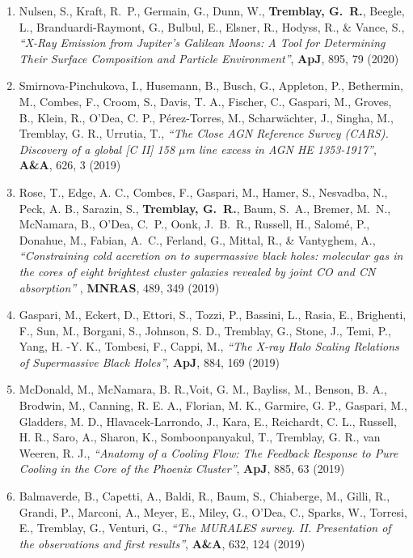 \documentclass[11pt]{article}
\begin{document}
\begin{enumerate}[resume]
\item Nulsen, S., Kraft, R.~P., Germain, G., Dunn, W.,
\textbf{Tremblay, G.~R.}, Beegle, L., Branduardi-Raymont, G.,
Bulbul, E., Elsner, R., Hodyss, R., \& Vance, S., \textit{``X-Ray Emission from Jupiter's Galilean Moons: A Tool for Determining Their Surface Composition and Particle Environment''}, \textbf{ApJ}, 895, 79 (2020)

\item Smirnova-Pinchukova, I., Husemann, B.,  Busch, G.,  Appleton, P., Bethermin, M., Combes, F., Croom, S., Davis, T. A., Fischer, C., Gaspari, M., Groves, B., Klein, R., O'Dea, C. P., Pérez-Torres, M., Scharwächter, J., Singha, M., Tremblay, G. R., Urrutia, T.,
\textit{``The Close AGN Reference Survey (CARS). Discovery of a global [C II] 158 $\mu$m line excess in AGN HE 1353-1917''},
\textbf{A\&A}, 626, 3 (2019)

\item Rose, T., Edge, A. C., Combes, F., Gaspari, M.,
Hamer, S., Nesvadba, N., Peck, A. B., Sarazin, S.,
\textbf{Tremblay, G.~R.}, Baum, S.~A., Bremer, M.~N.,
McNamara, B., O'Dea, C.~P., Oonk, J.~B.~R.,
Russell, H., Salom\'{e}, P., Donahue, M., Fabian, A.~C.,
Ferland, G., Mittal, R., \& Vantyghem, A.,
\textit{``Constraining cold accretion on to supermassive black holes: molecular gas in the cores of eight brightest cluster galaxies revealed by joint CO and CN absorption''
}, \textbf{MNRAS}, 489, 349 (2019)

\item Gaspari, M., Eckert, D., Ettori, S., Tozzi, P., Bassini, L., Rasia, E., Brighenti, F., Sun, M., Borgani, S., Johnson, S. D., Tremblay, G., Stone, J., Temi, P., Yang, H. -Y. K., Tombesi, F., Cappi, M., \textit{``The X-ray Halo Scaling Relations of Supermassive Black Holes''}, \textbf{ApJ}, 884, 169 (2019)

\item McDonald, M., McNamara, B. R.,Voit, G. M., Bayliss, M., Benson, B. A., Brodwin, M., Canning, R. E. A., Florian, M. K., Garmire, G. P., Gaspari, M., Gladders, M. D., Hlavacek-Larrondo, J., Kara, E., Reichardt, C. L., Russell, H. R., Saro, A., Sharon, K., Somboonpanyakul, T., Tremblay, G. R., van Weeren, R. J., \textit{``Anatomy of a Cooling Flow: The Feedback Response to Pure Cooling in the Core of the Phoenix Cluster''}, \textbf{ApJ}, 885, 63 (2019)


\item Balmaverde, B., Capetti, A., Baldi, R., Baum, S., Chiaberge, M., Gilli, R., Grandi, P., Marconi, A., Meyer, E., Miley, G., O'Dea, C., Sparks, W., Torresi, E., Tremblay, G., Venturi, G., \textit{``The MURALES survey. II. Presentation of the observations and first results''}, \textbf{A\&A}, 632, 124 (2019)


\end{enumerate}
\end{document}
